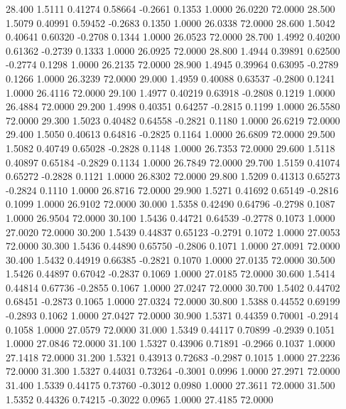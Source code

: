   28.400   1.5111   0.41274   0.58664  -0.2661   0.1353   1.0000  26.0220  72.0000
  28.500   1.5079   0.40991   0.59452  -0.2683   0.1350   1.0000  26.0338  72.0000
  28.600   1.5042   0.40641   0.60320  -0.2708   0.1344   1.0000  26.0523  72.0000
  28.700   1.4992   0.40200   0.61362  -0.2739   0.1333   1.0000  26.0925  72.0000
  28.800   1.4944   0.39891   0.62500  -0.2774   0.1298   1.0000  26.2135  72.0000
  28.900   1.4945   0.39964   0.63095  -0.2789   0.1266   1.0000  26.3239  72.0000
  29.000   1.4959   0.40088   0.63537  -0.2800   0.1241   1.0000  26.4116  72.0000
  29.100   1.4977   0.40219   0.63918  -0.2808   0.1219   1.0000  26.4884  72.0000
  29.200   1.4998   0.40351   0.64257  -0.2815   0.1199   1.0000  26.5580  72.0000
  29.300   1.5023   0.40482   0.64558  -0.2821   0.1180   1.0000  26.6219  72.0000
  29.400   1.5050   0.40613   0.64816  -0.2825   0.1164   1.0000  26.6809  72.0000
  29.500   1.5082   0.40749   0.65028  -0.2828   0.1148   1.0000  26.7353  72.0000
  29.600   1.5118   0.40897   0.65184  -0.2829   0.1134   1.0000  26.7849  72.0000
  29.700   1.5159   0.41074   0.65272  -0.2828   0.1121   1.0000  26.8302  72.0000
  29.800   1.5209   0.41313   0.65273  -0.2824   0.1110   1.0000  26.8716  72.0000
  29.900   1.5271   0.41692   0.65149  -0.2816   0.1099   1.0000  26.9102  72.0000
  30.000   1.5358   0.42490   0.64796  -0.2798   0.1087   1.0000  26.9504  72.0000
  30.100   1.5436   0.44721   0.64539  -0.2778   0.1073   1.0000  27.0020  72.0000
  30.200   1.5439   0.44837   0.65123  -0.2791   0.1072   1.0000  27.0053  72.0000
  30.300   1.5436   0.44890   0.65750  -0.2806   0.1071   1.0000  27.0091  72.0000
  30.400   1.5432   0.44919   0.66385  -0.2821   0.1070   1.0000  27.0135  72.0000
  30.500   1.5426   0.44897   0.67042  -0.2837   0.1069   1.0000  27.0185  72.0000
  30.600   1.5414   0.44814   0.67736  -0.2855   0.1067   1.0000  27.0247  72.0000
  30.700   1.5402   0.44702   0.68451  -0.2873   0.1065   1.0000  27.0324  72.0000
  30.800   1.5388   0.44552   0.69199  -0.2893   0.1062   1.0000  27.0427  72.0000
  30.900   1.5371   0.44359   0.70001  -0.2914   0.1058   1.0000  27.0579  72.0000
  31.000   1.5349   0.44117   0.70899  -0.2939   0.1051   1.0000  27.0846  72.0000
  31.100   1.5327   0.43906   0.71891  -0.2966   0.1037   1.0000  27.1418  72.0000
  31.200   1.5321   0.43913   0.72683  -0.2987   0.1015   1.0000  27.2236  72.0000
  31.300   1.5327   0.44031   0.73264  -0.3001   0.0996   1.0000  27.2971  72.0000
  31.400   1.5339   0.44175   0.73760  -0.3012   0.0980   1.0000  27.3611  72.0000
  31.500   1.5352   0.44326   0.74215  -0.3022   0.0965   1.0000  27.4185  72.0000
